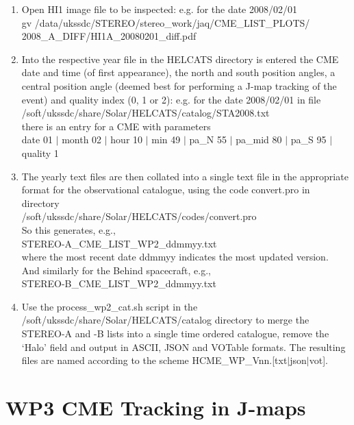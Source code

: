 \documentclass[12pt, a4paper, oneside]{article}
\begin{document}
\begin{enumerate}

\item Open HI1 image file to be inspected: e.g. for the date 2008/02/01 \\ \indent gv /data/ukssdc/STEREO/stereo\_work/jaq/CME\_LIST\_PLOTS/\\2008\_A\_DIFF/HI1A\_20080201\_diff.pdf

\item Into the respective year file in the HELCATS directory is entered the CME date and time (of first appearance), the north and south position angles, a central position angle (deemed best for performing a J-map tracking of the event) and quality index (0, 1 or 2): e.g. for the date 2008/02/01 in file \\
/soft/ukssdc/share/Solar/HELCATS/catalog/STA2008.txt \\
there is an entry for a CME with parameters\\
date 01 $|$ month 02 $|$ hour 10 $|$ min 49 $|$ pa\_N 55 $|$ pa\_mid 80 $|$ pa\_S 95 $|$ quality 1

\item The yearly text files are then collated into a single text file in the appropriate format for the observational catalogue, using the code convert.pro in directory\\ /soft/ukssdc/share/Solar/HELCATS/codes/convert.pro \\
So this generates, e.g.,\\ STEREO-A\_CME\_LIST\_WP2\_ddmmyy.txt \\ where the most recent date ddmmyy indicates the most updated version.\\ And similarly for the Behind spacecraft, e.g.,\\ STEREO-B\_CME\_LIST\_WP2\_ddmmyy.txt

\item Use the process\_wp2\_cat.sh script in the /soft/ukssdc/share/Solar/HELCATS/catalog directory to merge the STEREO-A and -B lists into a single time ordered catalogue, remove the `Halo' field and output in ASCII, JSON and VOTable formats. The resulting files are named according to the scheme HCME\_WP\_Vnn.[txt$|$json$|$vot].

\end{enumerate}

\section*{\sc WP3 CME Tracking in J-maps}
\end{document}
